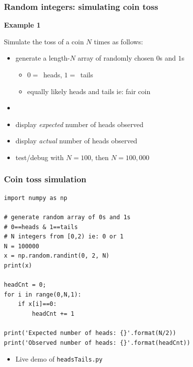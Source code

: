 \documentclass[english,14pt]{beamer}
\begin{document}
\begin{frame}[fragile]

\frametitle{Random integers: simulating coin toss}

\textbf{Example 1}\\
\vspace*{5mm}

Simulate the toss of a coin $N$ times as follows:

\begin{itemize}
	\item generate a length-$N$ array of randomly chosen $0$s and $1$s
	\begin{itemize}
		\item $0 = $~heads, $1 = $~tails
		\item equally likely heads and tails ie: fair coin
	\end{itemize}
	\item[]
	\item display \emph{expected} number of heads observed
	\item display \emph{actual} number of heads observed
	\item test/debug with $N=100$, then $N=100,000$
\end{itemize}

\end{frame}


\begin{frame}[fragile]

\frametitle{Coin toss simulation}
\vspace*{-3mm}
\begin{lstlisting}[style=CStyle]
import numpy as np

# generate random array of 0s and 1s
# 0==heads & 1==tails
# N integers from [0,2) ie: 0 or 1
N = 100000
x = np.random.randint(0, 2, N)
print(x)

headCnt = 0;
for i in range(0,N,1):
    if x[i]==0:
        headCnt += 1

print('Expected number of heads: {}'.format(N/2))
print('Observed number of heads: {}'.format(headCnt))
\end{lstlisting}
\vspace*{-3mm}
\begin{itemize}
	\item Live demo of \texttt{headsTails.py}
\end{itemize}

\end{frame}
\end{document}
